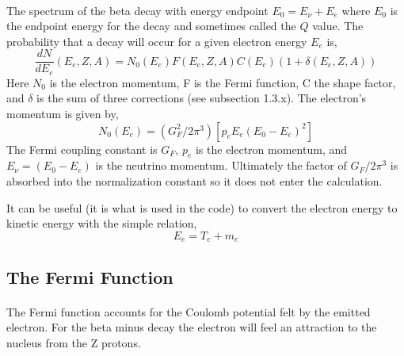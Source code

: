 \documentclass{report}
\begin{document}
\paragraph{}
The spectrum of the beta decay with energy endpoint $E_0 = E_{\nu} + E_e$ where $E_0$ is 
the endpoint energy for the decay and sometimes called the $Q$ value. The probability 
that a decay will occur for a given electron energy $E_e$ is,
\begin{equation}
\frac{dN}{dE_e}(E_e, Z, A) = N_0(E_e) F(E_e, Z, A) C(E_e) (1 + \delta(E_e, Z, A))
\end{equation}
Here $N_0$ is the electron momentum, F is the Fermi function, C the shape factor, and
 $\delta$ is the sum of three corrections (see subsection 1.3.x). The electron's momentum is given by,
\begin{equation}
N_0(E_e) = (G_F^2/2\pi^3)\left[p_e E_e (E_0 - E_e)^2\right]
\end{equation}
The Fermi coupling constant is $G_F$, $p_e$ is the electron momentum, and $E_{\nu} = (E_0 - E_e)$ is 
the neutrino momentum. Ultimately the factor of $G_F/2\pi^3$ is absorbed into the normalization constant
so it does not enter the calculation.

It can be useful (it is what is used in the code) to convert the electron energy to kinetic energy with the simple relation,
\begin{equation}
E_e = T_e + m_e
\end{equation}

\subsection{The Fermi Function}
\paragraph{} 
The Fermi function accounts for the Coulomb potential felt by the emitted electron. For the beta minus 
decay the electron will feel an attraction to the nucleus from the Z protons. 
\end{document}
